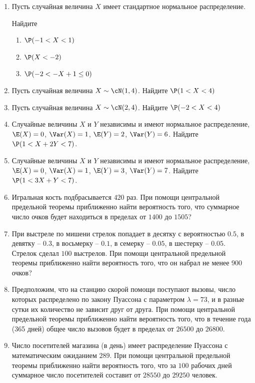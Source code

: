 \begin{enumerate}
\item Пусть случайная величина $X$ имеет стандартное нормальное распределение.

Найдите
\begin{enumerate}
\item $\P(-1 < X < 1)$
\item $\P(X < -2)$
\item $\P(-2 < -X + 1 \leq 0)$
\end{enumerate}

\item Пусть случайная величина $X \sim \cN(1,4)$. Найдите $\P(1<X<4)$

\item Пусть случайная величина $X \sim \cN(2,4)$. Найдите $\P(-2<X<4)$

\item Случайные величины $X$ и $Y$ независимы и  имеют нормальное распределение, $\E(X) = 0 $, $\Var(X) = 1$, $\E(Y) = 2$, $\Var(Y) = 6$. Найдите $\P(1 < X + 2Y < 7)$.

\item Случайные величины $X$ и $Y$ независимы и  имеют нормальное распределение, $\E(X) = 0 $, $\Var(X) = 1$, $\E(Y) = 3$, $\Var(Y) = 7$. Найдите $\P(1 < 3X + Y < 7)$.

\item Игральная кость подбрасывается $420$ раз. При помощи центральной предельной теоремы приближенно найти вероятность того, что суммарное число очков будет находиться в пределах от $1400$ до $1505$?

\item При выстреле по мишени стрелок попадает в десятку с вероятностью $0.5$, в девятку – $0.3$, в восьмерку – $0.1$, в семерку – $0.05$, в шестерку – $0.05$.
Стрелок сделал $100$ выстрелов. При помощи центральной предельной теоремы приближенно найти вероятность того, что он набрал не менее 900 очков?

\item Предположим, что на станцию скорой помощи поступают вызовы, число которых распределено по закону Пуассона с параметром $\lambda = 73$, и в разные сутки их количество не зависит друг от друга. При помощи центральной предельной теоремы приближенно найти вероятность того, что в течение года (365 дней) общее число вызовов будет в пределах от $26500$ до $26800$.

\item Число посетителей магазина (в день) имеет распределение Пуассона с математическим ожиданием $289$. При помощи центральной предельной теоремы приближенно найти вероятность того, что за $100$ рабочих дней суммарное число посетителей составит от $28550$ до $29250$ человек.


\end{enumerate}
